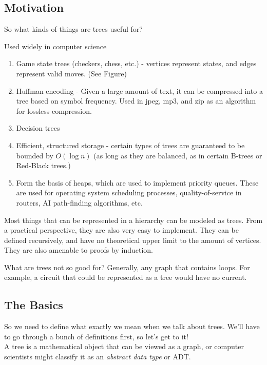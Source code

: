\documentclass[a4paper,10pt]{report}
\begin{document}
\subsection{Motivation}
So what kinds of things are trees useful for?

Used widely in computer science

\begin{enumerate}
	\item Game state trees (checkers, chess, etc.) - vertices represent states, and edges represent valid moves. (See Figure)
	\item Huffman encoding - Given a large amount of text, it can be compressed into a tree based on symbol frequency. Used in jpeg, mp3, and zip as an algorithm for lossless compression.
	\item Decision trees
	\item Efficient, structured storage - certain types of trees are guaranteed to be bounded by $O(\log n)$ (as long as they are balanced, as in certain B-trees or Red-Black trees.)
	\item Form the basis of heaps, which are used to implement priority queues. These are used for operating system scheduling processes, quality-of-service in routers, AI path-finding algorithms, etc.
\end{enumerate}

Most things that can be represented in a hierarchy can be modeled as trees. From a practical perspective, they are also very easy to implement. They can be defined recursively, and have no theoretical upper limit to the amount of vertices. They are also amenable to proofs by induction.

What are trees not so good for?
Generally, any graph that contains loops. For example, a circuit that could be represented as a tree would have no current.

\subsection{The Basics}
So we need to define what exactly we mean when we talk about trees. We'll have to go through a bunch of definitions first, so let's get to it!\\

A tree is a mathematical object that can be viewed as a graph, or computer scientists might classify it as an \textit{abstract data type} or ADT.\\
\end{document}
